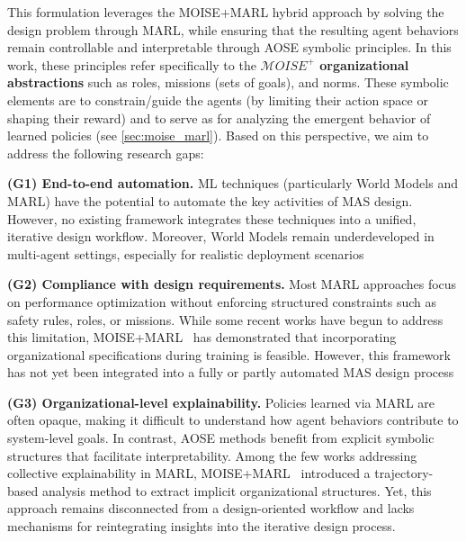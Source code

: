 \documentclass[pdflatex,sn-mathphys-num]{sn-jnl}%
\theoremstyle{thmstyleone}%
\theoremstyle{thmstyletwo}%
\theoremstyle{thmstylethree}%
\begin{document}
\noindent This formulation leverages the MOISE+MARL hybrid approach by solving the design problem through MARL, while ensuring that the resulting agent behaviors remain controllable and interpretable through AOSE symbolic principles. In this work, these principles refer specifically to the \textbf{$\mathcal{M}OISE^+$ organizational abstractions} such as roles, missions (sets of goals), and norms. These symbolic elements are to constrain/guide the agents (by limiting their action space or shaping their reward) and to serve as  for analyzing the emergent behavior of learned policies (see \autoref{sec:moise_marl}).
Based on this perspective, we aim to address the following research gaps:
%
\begin{enumerate*}[label={\roman*)}, itemjoin={; \quad}]
    \item \textbf{(G1) End-to-end automation.} ML techniques (particularly World Models and MARL) have the potential to automate the key activities of MAS design. However, no existing framework integrates these techniques into a unified, iterative design workflow. Moreover, World Models remain underdeveloped in multi-agent settings, especially for realistic deployment scenarios
          
    \item \textbf{(G2) Compliance with design requirements.} Most MARL approaches focus on performance optimization without enforcing structured constraints such as safety rules, roles, or missions. While some recent works have begun to address this limitation, MOISE+MARL~\cite{soule2025moisemarl} has demonstrated that incorporating organizational specifications during training is feasible. However, this framework has not yet been integrated into a fully or partly automated MAS design process
          
    \item \textbf{(G3) Organizational-level explainability.} Policies learned via MARL are often opaque, making it difficult to understand how agent behaviors contribute to system-level goals. In contrast, AOSE methods benefit from explicit symbolic structures that facilitate interpretability. Among the few works addressing collective explainability in MARL, MOISE+MARL~\cite{soule2025moisemarl} introduced a trajectory-based analysis method to extract implicit organizational structures. Yet, this approach remains disconnected from a design-oriented workflow and lacks mechanisms for reintegrating insights into the iterative design process.
\end{enumerate*}
\end{document}
